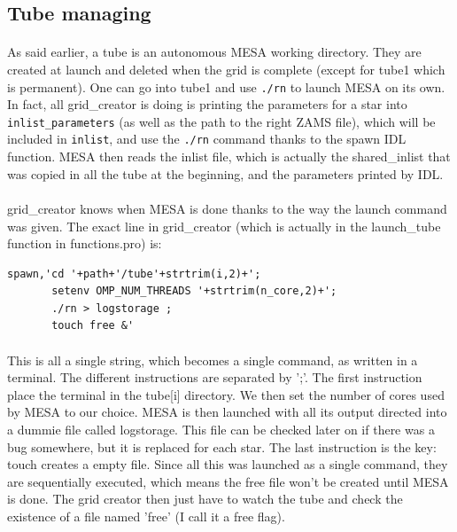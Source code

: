 \documentclass{report}
\begin{document}
\subsection{Tube managing}

\paragraph{}As said earlier, a tube is an autonomous MESA working directory. They are created at launch and deleted when the grid is complete (except for tube1 which
is permanent). One can go into tube1 and use \verb+./rn+ to launch MESA on its own. In fact, all grid\_creator is doing is printing the parameters for a
star into \verb+inlist_parameters+ (as well as the path to the right ZAMS file), which will be included in \verb+inlist+, and use the \verb+./rn+ command thanks to the spawn IDL function. MESA then 
reads the inlist file, which is actually the shared\_inlist that was copied in all the tube at the beginning, and the parameters printed by IDL.

\paragraph{}grid\_creator knows when MESA is done thanks to the way the launch command was given. The exact line in grid\_creator (which is actually
in the launch\_tube function in functions.pro) is:
\begin{verbatim}
spawn,'cd '+path+'/tube'+strtrim(i,2)+';
       setenv OMP_NUM_THREADS '+strtrim(n_core,2)+';
       ./rn > logstorage ;
       touch free &'
\end{verbatim}
\paragraph{}This is all a single string, which becomes a single command, as written in a terminal. The different instructions are separated by ';'.
The first instruction place the terminal in the tube[i] directory. We then set the number of cores used by MESA to our choice. MESA is then launched
with all its output directed into a dummie file called logstorage. This file can be checked later on if there was a bug somewhere, but it is replaced
for each star. The last instruction is the key: touch creates a empty file. Since all this was launched as a single command, they are sequentially
executed, which means the free file won't be created until MESA is done. The grid creator then just have to watch the tube and check the existence of 
a file named 'free' (I call it a free flag).
\end{document}

